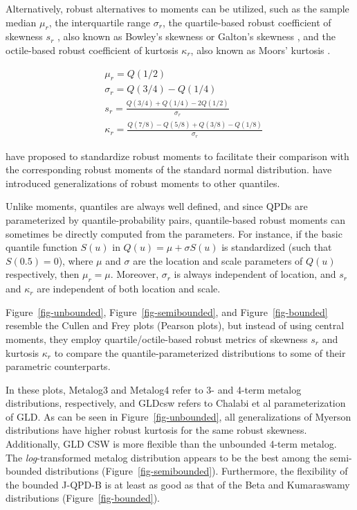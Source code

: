 \documentclass[
  fleqn,
  deca,
  blindrev
]{informs4}
\begin{document}
Alternatively, robust alternatives to moments can be utilized, such as
the sample median \(\mu_r\), the interquartile range \(\sigma_r\), the
quartile-based robust coefficient of skewness \(s_r\)
\citep{kim2004MoreRobustEstimation}, also known as Bowley's skewness
\citep{bowley1920ElementsStatistics} or Galton's skewness
\citep{gilchrist2000StatisticalModellingQuantile}, and the octile-based
robust coefficient of kurtosis \(\kappa_r\), also known as Moors'
kurtosis \citep{moors1988QuantileAlternativeKurtosis}.

\[
\begin{aligned}
&\mu_r=Q(1/2)\\
&\sigma_r=Q(3/4)-Q(1/4)\\
&s_r=\frac{Q(3/4)+Q(1/4)-2Q(1/2)}{\sigma_r}\\
&\kappa_r=\frac{Q(7/8)-Q(5/8)+Q(3/8)-Q(1/8)}{\sigma_r}
\end{aligned}
\]

\citep{kim2004MoreRobustEstimation, arachchige2022RobustAnalogsCoefficient}
have proposed to standardize robust moments to facilitate their
comparison with the corresponding robust moments of the standard normal
distribution.
\citep{groeneveld1998ClassQuantileMeasures, jones2011SkewnessInvariantMeasuresKurtosis}
have introduced generalizations of robust moments to other quantiles.

Unlike moments, quantiles are always well defined, and since QPDs are
parameterized by quantile-probability pairs, quantile-based robust
moments can sometimes be directly computed from the parameters. For
instance, if the basic quantile function \(S(u)\) in
\(Q(u)=\mu+\sigma S(u)\) is standardized (such that \(S(0.5)=0\)), where
\(\mu\) and \(\sigma\) are the location and scale parameters of \(Q(u)\)
respectively, then \(\mu_r=\mu\). Moreover, \(\sigma_r\) is always
independent of location, and \(s_r\) and \(\kappa_r\) are independent of
both location and scale.

Figure~\ref{fig-unbounded}, Figure~\ref{fig-semibounded}, and
Figure~\ref{fig-bounded} resemble the Cullen and Frey
\citep{cullen1999ProbabilisticTechniquesExposure} plots (Pearson plots),
but instead of using central moments, they employ quartile/octile-based
robust metrics of skewness \(s_r\) and kurtosis \(\kappa_r\) to compare
the quantile-parameterized distributions to some of their parametric
counterparts.

In these plots, Metalog3 and Metalog4 refer to 3- and 4-term metalog
distributions, respectively, and GLDcsw refers to Chalabi et al
\citep{chalabi2012FlexibleDistributionModeling} parameterization of GLD.
As can be seen in Figure~\ref{fig-unbounded}, all generalizations of
Myerson distributions have higher robust kurtosis for the same robust
skewness. Additionally, GLD CSW is more flexible than the unbounded
4-term metalog. The \emph{log}-transformed metalog distribution appears
to be the best among the semi-bounded distributions
(Figure~\ref{fig-semibounded}). Furthermore, the flexibility of the
bounded J-QPD-B is at least as good as that of the Beta and Kumaraswamy
distributions (Figure~\ref{fig-bounded}).
\end{document}
